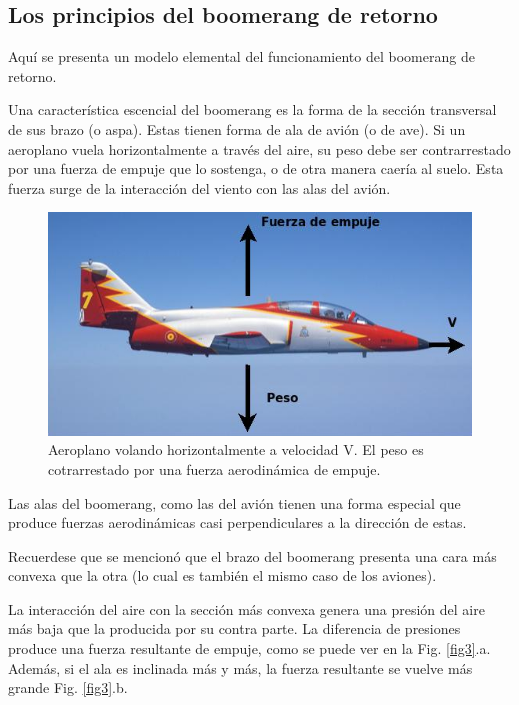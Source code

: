 		\subsection{ Los principios del boomerang de retorno}

	Aquí se presenta un modelo elemental del funcionamiento del boomerang de retorno.

	Una característica escencial del boomerang es la forma de la sección transversal de sus brazo (o aspa). Estas tienen forma de ala de avión (o de ave). Si un aeroplano vuela horizontalmente a través del aire, su peso debe ser contrarrestado por una fuerza de empuje que lo sostenga, o de otra manera caería al suelo. Esta fuerza surge de la interacción del viento con las alas del avión.

		\begin{figure}[ht]
		\begin{center}
		\includegraphics[scale=0.4]{imagenes/3-boomerang/plane.jpg}
		\caption{Aeroplano volando horizontalmente a velocidad V. El peso es cotrarrestado por una fuerza aerodinámica de empuje.}
		\label{fig2}
		\end{center}
		\end{figure}

	Las alas del boomerang, como las del avión tienen una forma especial que produce fuerzas aerodinámicas casi perpendiculares a la dirección de estas.

	Recuerdese que se mencionó que el brazo del boomerang presenta una cara más convexa que la otra  (lo cual es también el mismo caso de los aviones).

	La interacción del aire con la sección más convexa genera una presión del aire más baja que la producida por su contra parte. La diferencia de presiones produce una fuerza resultante de empuje, como se puede ver en la Fig. \ref{fig3}.a. Además, si el ala es inclinada más y más, la fuerza resultante se vuelve más grande Fig. \ref{fig3}.b.

